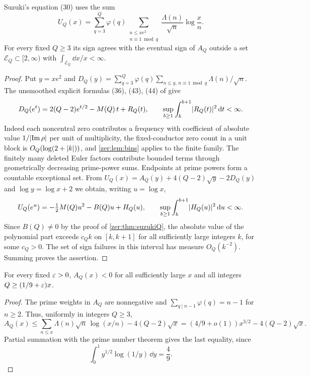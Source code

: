 \begin{proposition}\label{zer:prop:UQ}
Suzuki's equation (30) uses the sum
\[
 U_Q(x)=\sum_{q=3}^Q\varphi(q)\sum_{\substack{n\le xe^2\\n\equiv1\bmod q}}
   \frac{\Lambda(n)}{\sqrt n}\log\frac xn .
\]
For every fixed $Q\ge3$ its sign agrees with the eventual sign of $A_Q$ outside a set
$\mathcal E_Q\subset[2,\infty)$ with $\int_{\mathcal E_Q}\dd x/x<\infty$.
\end{proposition}
\begin{proof}
Put $y=xe^2$ and
$D_Q(y)=\sum_{q=3}^Q\varphi(q)\sum_{n\le y,\,n\equiv1\bmod q}\Lambda(n)/\sqrt n$. The
unsmoothed explicit formulas (36), (43), (44) of \cite{Suzuki2025Variants} give
\[
 D_Q(e^t)=2(Q-2)e^{t/2}-M(Q)\,t+R_Q(t),\qquad
 \sup_{b\ge1}\int_b^{b+1}\lvert R_Q(t)\rvert^2\,\mathrm{d} t<\infty .
\]
Indeed each noncentral zero contributes a frequency with coefficient of absolute value
$1/\lvert\operatorname{Im}\rho\rvert$ per unit of multiplicity, the fixed-conductor zero count in a unit block
is $O_Q(\log(2+\lvert k\rvert))$, and \cref{zer:lem:bins} applies to the finite family. The
finitely many deleted Euler factors contribute bounded terms through geometrically
decreasing prime-power sums. Endpoints at prime powers form a countable exceptional set.
From $U_Q(x)=A_Q(y)+4(Q-2)\sqrt y-2D_Q(y)$ and $\log y=\log x+2$ we obtain, writing
$u=\log x$,
\[
 U_Q(e^u)=-\tfrac12M(Q)u^2-B(Q)u+H_Q(u),\qquad
 \sup_{b\ge1}\int_b^{b+1}\lvert H_Q(u)\rvert^2\,\mathrm{d} u<\infty .
\]
Since $B(Q)\ne0$ by the proof of \cref{zer:thm:suzukiQ}, the absolute value of the
polynomial part exceeds $c_Qk$ on $[k,k+1]$ for all sufficiently large integers $k$, for
some $c_Q>0$. The set of sign failures in this interval has measure $O_Q(k^{-2})$. Summing
proves the assertion.
\end{proof}

\begin{proposition}\label{zer:prop:growing}
For every fixed $\varepsilon>0$, $A_Q(x)<0$ for all sufficiently large $x$ and all integers
$Q\ge(1/9+\varepsilon)x$.
\end{proposition}
\begin{proof}
The prime weights in $A_Q$ are nonnegative and $\sum_{q\mid n-1}\varphi(q)=n-1$ for
$n\ge2$. Thus, uniformly in integers $Q\ge3$,
\[
 A_Q(x)\le\sum_{n\le x}\Lambda(n)\sqrt n\,\log(x/n)-4(Q-2)\sqrt x
 =(4/9+o(1))x^{3/2}-4(Q-2)\sqrt x .
\]
Partial summation with the prime number theorem gives the last equality, since
\[
 \int_0^1y^{1/2}\log(1/y)\,\dd y=\frac49 .
\]
\end{proof}

